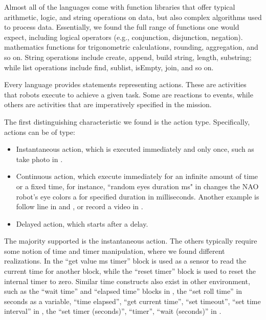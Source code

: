  Almost all of the languages come with function libraries that offer typical arithmetic, logic, and string operations on data, but also complex algorithms used to process data. 
Essentially, we found the full range of functions one would expect, including logical operators (e.g., conjunction, disjunction, negation).
mathematics functions for trigonometric calculations, rounding, aggregation, and so on. 
String operations include create, append, build string, length, substring; while list operations include find, sublist, isEmpty, join, and so on.  %

 
\parhead{\factions} Every language provides statements representing actions. These are activities that robots execute to achieve a given task. Some are reactions to events, while others are activities that are imperatively specified in the mission.

The first distinguishing characteristic we found is the action type. Specifically, actions can be of type:
\begin{itemize}
	\item Instantaneous action, which is executed immediately and only once, such as take photo in \flyaq. %
	\item Continuous action, which execute immediately for an infinite amount of time or a fixed time, for instance, ``random eyes duration ms" in \openroberta changes the NAO robot's eye colors a for specified duration in milliseconds. Another example is follow line in \lego and \sphero, or record a video in \flyaq.
	\item Delayed action, which starts after a delay.
\end{itemize}

The majority supported is the instantaneous action. The others typically require some notion of time and timer manipulation, where we found different realizations. In \lego the ``get value ms timer'' block is used as a sensor to read the current time for another block, while the ``reset timer'' block is used to reset the internal timer to zero. Similar time constructs also exist in other environment, such as the ``wait time'' and ``elapsed time'' blocks in \ardublockly, the ``set roll time'' in seconds as a variable, ``time elapsed'', ``get current time'', ``set timeout'', ``set time interval'' in \sphero, the ``set timer (seconds)'', ``timer'', ``wait (seconds)'' in \vex.

